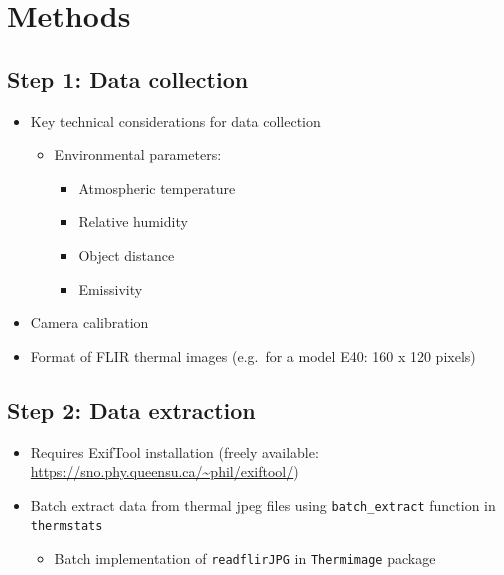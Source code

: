 \documentclass[12pt,a4paper,]{report}
\providecommand{\tightlist}{%
  \setlength{\itemsep}{0pt}\setlength{\parskip}{0pt}}
\theoremstyle{definition}
\theoremstyle{definition}
\theoremstyle{definition}
\theoremstyle{remark}
\begin{document}
\section{Methods}\label{methods-1}

\subsection{Step 1: Data collection}\label{step-1-data-collection}

\begin{itemize}
\tightlist
\item
  Key technical considerations for data collection

  \begin{itemize}
  \tightlist
  \item
    Environmental parameters:

    \begin{itemize}
    \tightlist
    \item
      Atmospheric temperature
    \item
      Relative humidity
    \item
      Object distance
    \item
      Emissivity
    \end{itemize}
  \end{itemize}
\item
  Camera calibration
\item
  Format of FLIR thermal images (e.g.~for a model E40: 160 x 120 pixels)
\end{itemize}

\subsection{Step 2: Data extraction}\label{step-2-data-extraction}

\begin{itemize}
\tightlist
\item
  Requires ExifTool installation (freely available:
  \url{https://sno.phy.queensu.ca/~phil/exiftool/})
\item
  Batch extract data from thermal jpeg files using
  \texttt{batch\_extract} function in \texttt{thermstats}

  \begin{itemize}
  \tightlist
  \item
    Batch implementation of \texttt{readflirJPG} in \texttt{Thermimage}
    package
  \end{itemize}
\end{itemize}
\end{document}
